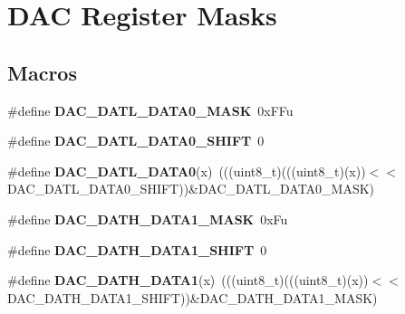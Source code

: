 \hypertarget{group__DAC__Register__Masks}{}\section{D\+AC Register Masks}
\label{group__DAC__Register__Masks}
\subsection*{Macros}
\begin{DoxyCompactItemize}
\item 
\#define {\bfseries D\+A\+C\+\_\+\+D\+A\+T\+L\+\_\+\+D\+A\+T\+A0\+\_\+\+M\+A\+SK}~0x\+F\+Fu\hypertarget{group__DAC__Register__Masks_ga06d752efe9ec5bab7d61ccf9c2689345}{}\label{group__DAC__Register__Masks_ga06d752efe9ec5bab7d61ccf9c2689345}

\item 
\#define {\bfseries D\+A\+C\+\_\+\+D\+A\+T\+L\+\_\+\+D\+A\+T\+A0\+\_\+\+S\+H\+I\+FT}~0\hypertarget{group__DAC__Register__Masks_gad9030129a0f34502c115abd36728d001}{}\label{group__DAC__Register__Masks_gad9030129a0f34502c115abd36728d001}

\item 
\#define {\bfseries D\+A\+C\+\_\+\+D\+A\+T\+L\+\_\+\+D\+A\+T\+A0}(x)~(((uint8\+\_\+t)(((uint8\+\_\+t)(x))$<$$<$D\+A\+C\+\_\+\+D\+A\+T\+L\+\_\+\+D\+A\+T\+A0\+\_\+\+S\+H\+I\+FT))\&D\+A\+C\+\_\+\+D\+A\+T\+L\+\_\+\+D\+A\+T\+A0\+\_\+\+M\+A\+SK)\hypertarget{group__DAC__Register__Masks_ga87995bd867b0ea7e137b5a5a8cbfdf1e}{}\label{group__DAC__Register__Masks_ga87995bd867b0ea7e137b5a5a8cbfdf1e}

\item 
\#define {\bfseries D\+A\+C\+\_\+\+D\+A\+T\+H\+\_\+\+D\+A\+T\+A1\+\_\+\+M\+A\+SK}~0x\+Fu\hypertarget{group__DAC__Register__Masks_ga98c0e999ae86d666b5d6fa8df700ba6f}{}\label{group__DAC__Register__Masks_ga98c0e999ae86d666b5d6fa8df700ba6f}

\item 
\#define {\bfseries D\+A\+C\+\_\+\+D\+A\+T\+H\+\_\+\+D\+A\+T\+A1\+\_\+\+S\+H\+I\+FT}~0\hypertarget{group__DAC__Register__Masks_ga0056432036b350d3839554982acfbff1}{}\label{group__DAC__Register__Masks_ga0056432036b350d3839554982acfbff1}

\item 
\#define {\bfseries D\+A\+C\+\_\+\+D\+A\+T\+H\+\_\+\+D\+A\+T\+A1}(x)~(((uint8\+\_\+t)(((uint8\+\_\+t)(x))$<$$<$D\+A\+C\+\_\+\+D\+A\+T\+H\+\_\+\+D\+A\+T\+A1\+\_\+\+S\+H\+I\+FT))\&D\+A\+C\+\_\+\+D\+A\+T\+H\+\_\+\+D\+A\+T\+A1\+\_\+\+M\+A\+SK)\hypertarget{group__DAC__Register__Masks_ga22ebc926dfe59f28a37b532767780fbc}{}\label{group__DAC__Register__Masks_ga22ebc926dfe59f28a37b532767780fbc}


\end{DoxyCompactItemize}
